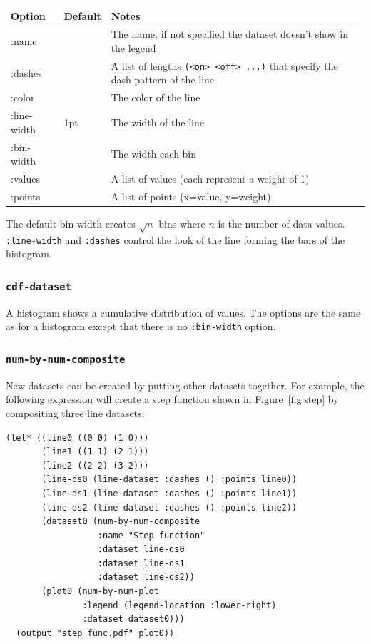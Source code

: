\documentclass{article}
\begin{document}
\begin{center}
\begin{tabular}{lll}
Option & Default & Notes \\
\hline
:name & & The name, if not specified the dataset doesn't show in
the legend\\
:dashes & & A list of lengths {\tt (<on> <off> ...)} that specify the
dash pattern of the line\\
:color & & The color of the line\\
:line-width & 1pt & The width of the line\\
:bin-width &  & The width each bin\\
:values & & A list of values (each represent a weight of 1) \\
:points & & A list of points (x=value, y=weight)\\
\end{tabular}
\end{center}

The default bin-width creates $\sqrt{n}$ bins where $n$ is the number
of data values.  {\tt :line-width} and {\tt :dashes} control the look
of the line forming the bars of the histogram.

\subsubsection{\tt cdf-dataset}

A histogram shows a cumulative distribution of values.
The options are the same as for a histogram except that there is no
{\tt :bin-width} option.

\subsubsection{\tt num-by-num-composite}

New datasets can be created by putting other datasets together.  For
example, the following expression will create a step function shown in
Figure~\ref{fig:step} by compositing three line datasets:

\begin{verbatim}
(let* ((line0 ((0 0) (1 0)))
       (line1 ((1 1) (2 1)))
       (line2 ((2 2) (3 2)))
       (line-ds0 (line-dataset :dashes () :points line0))
       (line-ds1 (line-dataset :dashes () :points line1))
       (line-ds2 (line-dataset :dashes () :points line2))
       (dataset0 (num-by-num-composite
                  :name "Step function"
                  :dataset line-ds0
                  :dataset line-ds1
                  :dataset line-ds2))
       (plot0 (num-by-num-plot
               :legend (legend-location :lower-right)
               :dataset dataset0)))
  (output "step_func.pdf" plot0))
\end{verbatim}
\end{document}
